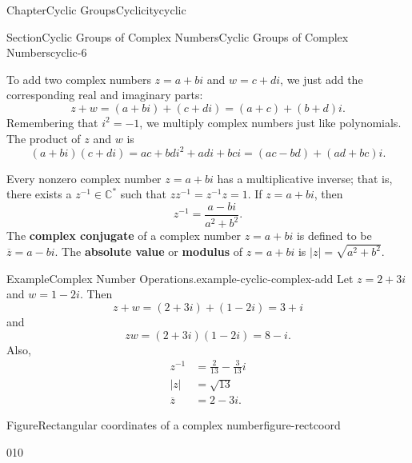\documentclass[oneside,10pt,]{book}
\newcommand{\terminology}[1]{\textbf{#1}}
\numberwithin{equation}{section}
\begin{document}
\begin{chapterptx}{Chapter}{Cyclic Groups}{}{Cyclicity}{}{}{cyclic}
\begin{sectionptx}{Section}{Cyclic Groups of Complex Numbers}{}{Cyclic Groups of Complex Numbers}{}{}{cyclic-6}
\par
To add two complex numbers \(z=a+bi\) and \(w= c+di\), we just add the corresponding real and imaginary parts:%
\begin{equation*}
z + w=(a + bi ) + (c + di)  =  (a + c) + (b + d)i\text{.}
\end{equation*}
Remembering that \(i^2 = -1\),  we multiply complex numbers just like polynomials. The product of \(z\) and \(w\) is%
\begin{equation*}
(a + bi )(c + di)  =   ac + bdi^2 + adi + bci =  (ac -bd) +(ad + bc)i\text{.}
\end{equation*}
%
\par
Every nonzero complex number \(z = a +bi\) has a multiplicative inverse; that is, there exists a \(z^{-1} \in {\mathbb C}^\ast\) such that \(z z^{-1} = z^{-1} z = 1\). If \(z = a + bi\), then%
\begin{equation*}
z^{-1} = \frac{a-bi}{ a^2 + b^2  }\text{.}
\end{equation*}
The \terminology{complex conjugate} of a complex number \(z = a + bi\) is defined to be \(\overline{z} = a- bi\).  The \terminology{absolute value} or \terminology{modulus} of  \(z = a + bi\)  is \(|z| = \sqrt{a^2 + b^2}\).%
\begin{example}{Example}{Complex Number Operations.}{example-cyclic-complex-add}%
Let \(z = 2 + 3i\) and \(w = 1-2i\). Then%
\begin{equation*}
z + w = (2 + 3i) + (1 - 2i) = 3 + i
\end{equation*}
and%
\begin{equation*}
z  w = (2 + 3i)(1 - 2i ) = 8 - i\text{.}
\end{equation*}
Also,%
\begin{align*}
z^{-1} & = \frac{2}{13} - \frac{3}{13}i\\
|z| & = \sqrt{13}\\
\overline{z} & = 2-3i\text{.}
\end{align*}
%
\end{example}
\begin{figureptx}{Figure}{Rectangular coordinates of a complex number}{figure-rectcoord}{}%
\begin{image}{0}{1}{0}{}%
\end{image}
\end{figureptx}
\end{sectionptx}
\end{chapterptx}
\end{document}
